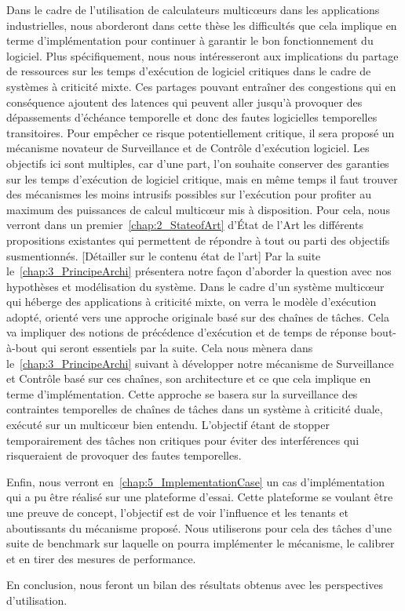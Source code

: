 \documentclass[french, a4paper, 11pt, twoside, pdftex]{StyleThese}
\begin{document}
	Dans le cadre de l'utilisation de calculateurs multicœurs dans les applications industrielles, nous aborderont dans cette thèse les difficultés que cela implique en terme d'implémentation pour continuer à garantir le bon fonctionnement du logiciel. Plus spécifiquement, nous nous intéresseront aux implications du partage de ressources sur les temps d'exécution de logiciel critiques dans le cadre de systèmes à criticité mixte. Ces partages pouvant entraîner des congestions qui en conséquence ajoutent des latences qui peuvent aller jusqu'à provoquer des dépassements d'échéance temporelle et donc des fautes logicielles temporelles transitoires. Pour empêcher ce risque potentiellement critique, il sera proposé un mécanisme novateur de Surveillance et de Contrôle d'exécution logiciel. Les objectifs ici sont multiples, car d'une part, l'on souhaite conserver des garanties sur les temps d'exécution de logiciel critique, mais en même temps il faut trouver des mécanismes les moins intrusifs possibles sur l'exécution pour profiter au maximum des puissances de calcul multicœur mis à disposition. 
	Pour cela, nous verront dans un premier~\autoref{chap:2_StateofArt} d'État de l'Art les différents propositions existantes qui permettent de répondre à tout ou parti des objectifs susmentionnés. \alert{[Détailler sur le contenu état de l'art]}
	Par la suite le~\autoref{chap:3_PrincipeArchi} présentera notre façon d'aborder la question avec nos hypothèses et modélisation du système. Dans le cadre d'un système multicœur qui héberge des applications à criticité mixte, on verra le modèle d'exécution adopté, orienté vers une approche originale basé sur des chaînes de tâches. Cela va impliquer des notions de précédence d'exécution et de temps de réponse bout-à-bout qui seront essentiels par la suite.
	Cela nous mènera dans le~\autoref{chap:3_PrincipeArchi} suivant à développer notre mécanisme de Surveillance et Contrôle basé sur ces chaînes, son architecture et ce que cela implique en terme d'implémentation. Cette approche se basera sur la surveillance des contraintes temporelles de chaînes de tâches dans un système à criticité duale, exécuté sur un multicœur bien entendu. L'objectif étant de stopper temporairement des tâches non critiques pour éviter des interférences qui risqueraient de provoquer des fautes temporelles.
	
	Enfin, nous verront en~\autoref{chap:5_ImplementationCase} un cas d'implémentation qui a pu être réalisé sur une plateforme d'essai. Cette plateforme se voulant être une preuve de concept, l'objectif est de voir l'influence et les tenants et aboutissants du mécanisme proposé. Nous utiliserons pour cela des tâches d'une suite de benchmark sur laquelle on pourra implémenter le mécanisme, le calibrer et en tirer des mesures de performance.
	
	En conclusion, nous feront un bilan des résultats obtenus avec les perspectives d'utilisation. 
    


\ifdefined{}
\else


\end{document}
